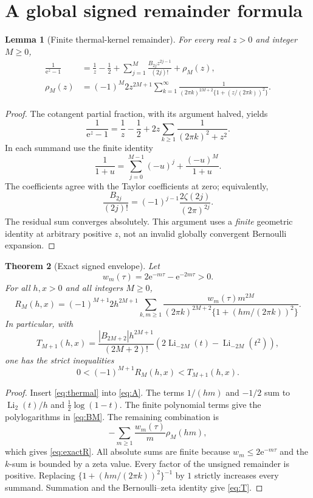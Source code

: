 \documentclass[11pt,a4paper]{article}
\newcommand{\ee}{\mathrm e}
\newcommand{\Li}{\operatorname{Li}}
\numberwithin{equation}{section}
\theoremstyle{plain}
\newtheorem{theorem}{Theorem}[section]
\newtheorem{lemma}[theorem]{Lemma}
\theoremstyle{definition}
\theoremstyle{remark}
\begin{document}
\section{A global signed remainder formula}
\label{sec:signed}

\begin{lemma}[Finite thermal-kernel remainder]
\label{lem:thermal}
For every real $z>0$ and integer $M\ge0$,
\begin{align}
 \frac1{\ee^z-1}
 &=\frac1z-\frac12+\sum_{j=1}^{M}\frac{B_{2j}z^{2j-1}}{(2j)!}
       +\rho_M(z),\label{eq:thermal}\\
 \rho_M(z)
 &=(-1)^M2z^{2M+1}\sum_{k=1}^{\infty}
   \frac{1}{(2\pi k)^{2M+2}\{1+(z/(2\pi k))^2\}}.
 \label{eq:rho}
\end{align}
\end{lemma}
\begin{proof}
The cotangent partial fraction, with its argument halved, yields
\[
 \frac1{\ee^z-1}=\frac1z-\frac12+
              2z\sum_{k\ge1}\frac1{(2\pi k)^2+z^2}.
\]
In each summand use the finite identity
\[
 \frac1{1+u}=\sum_{j=0}^{M-1}(-u)^j+\frac{(-u)^M}{1+u}.
\]
The coefficients agree with the Taylor coefficients at zero; equivalently,
\[\frac{B_{2j}}{(2j)!}=(-1)^{j-1}\frac{2\zeta(2j)}{(2\pi)^{2j}}.\]
The residual sum converges absolutely. This argument uses a \emph{finite}
geometric identity at arbitrary positive $z$, not an invalid globally
convergent Bernoulli expansion.
\end{proof}

\begin{theorem}[Exact signed envelope]
\label{thm:signed}
Let
\begin{equation}
 w_m(\tau)=2\ee^{-m\tau}-\ee^{-2m\tau}>0.
 \label{eq:w}
\end{equation}
For all $h,x>0$ and all integers $M\ge0$,
\begin{equation}
 \boxed{R_M(h,x)=(-1)^{M+1}2h^{2M+1}
 \sum_{k,m\ge1}\frac{w_m(\tau)m^{2M}}
 {(2\pi k)^{2M+2}\{1+(hm/(2\pi k))^2\}}.}
 \label{eq:exactR}
\end{equation}
In particular, with
\begin{equation}
 T_{M+1}(h,x)=\frac{|B_{2M+2}|h^{2M+1}}{(2M+2)!}
       \left(2\Li_{-2M}(t)-\Li_{-2M}(t^2)\right),
 \label{eq:T}
\end{equation}
one has the strict inequalities
\begin{equation}
 0<(-1)^{M+1}R_M(h,x)<T_{M+1}(h,x).
 \label{eq:envelope}
\end{equation}
\end{theorem}
\begin{proof}
Insert \eqref{eq:thermal} into \eqref{eq:A}. The terms $1/(hm)$ and
$-1/2$ sum to $\Li_2(t)/h$ and $\tfrac12\log(1-t)$.
The finite polynomial terms give the polylogarithms in \eqref{eq:BM}.
The remaining combination is
\[
 -\sum_{m\ge1}\frac{w_m(\tau)}m\rho_M(hm),
\]
which gives \eqref{eq:exactR}. All absolute sums are finite because
$w_m\le2\ee^{-m\tau}$ and the $k$-sum is bounded by a zeta value.
Every factor of the unsigned remainder is positive. Replacing
$\{1+(hm/(2\pi k))^2\}^{-1}$ by $1$ strictly increases every summand.
Summation and the Bernoulli--zeta identity give \eqref{eq:T}.
\end{proof}
\end{document}
